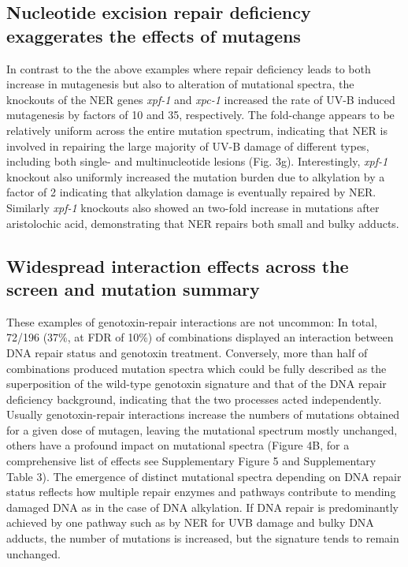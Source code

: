\subsection{Nucleotide excision repair deficiency exaggerates the effects of mutagens}

In contrast to the the above examples where repair deficiency leads to both increase in mutagenesis but also to alteration of mutational spectra, the knockouts of the NER genes \textit{xpf-1} and \textit{xpc-1} increased the rate of UV-B induced mutagenesis by factors of 10 and 35, respectively. The fold-change appears to be relatively uniform across the entire mutation spectrum, indicating that NER is involved in repairing the large majority of UV-B damage of different types, including both single- and multinucleotide lesions (Fig. 3g). Interestingly, \textit{xpf-1} knockout also uniformly increased the mutation burden due to alkylation by a factor of 2 indicating that alkylation damage is eventually repaired by NER. Similarly \textit{xpf-1} knockouts also showed an two-fold increase in mutations after aristolochic acid, demonstrating that NER repairs both small and bulky adducts.


\subsection{Widespread interaction effects across the screen and mutation summary}

These examples of genotoxin-repair interactions are not uncommon: In total, 72/196 (37\%, at FDR of 10\%) of combinations displayed an interaction between DNA repair status and genotoxin treatment. Conversely, more than half of combinations produced mutation spectra which could be fully described as the superposition of the wild-type genotoxin signature and that of the DNA repair deficiency background, indicating that the two processes acted independently. Usually genotoxin-repair interactions increase the numbers of mutations obtained for a given dose of mutagen, leaving the mutational spectrum mostly unchanged, others have a profound impact on mutational spectra (Figure 4B, for a comprehensive list of effects see Supplementary Figure 5 and Supplementary Table 3). The emergence of distinct mutational spectra depending on DNA repair status reflects how multiple repair enzymes and pathways contribute to mending damaged DNA as in the case of DNA alkylation. If DNA repair is predominantly achieved by one pathway such as by NER for UVB damage and bulky DNA adducts, the number of mutations is increased, but the signature tends to remain unchanged.

